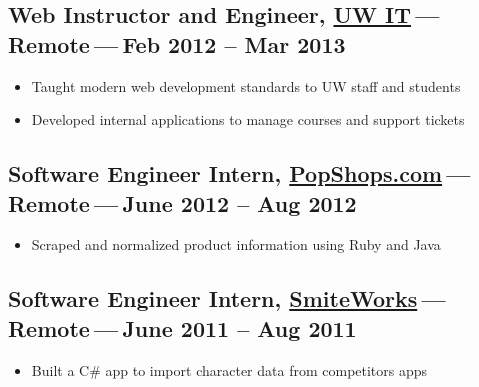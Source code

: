 \documentclass[11pt]{amsart}
\begin{document}
\hypertarget{x-web-instructor-and-engineer,-\href{https://www.washington.edu/lst/workshops/}{uw-it} — remote — feb-2012-–-mar-2013}{\subsection*{Web Instructor and Engineer, \href{https://www.washington.edu/lst/workshops/}{UW IT} — Remote — Feb 2012 – Mar 2013}}
\begin{itemize}

\item Taught modern web development standards to UW staff and students

\item Developed internal applications to manage courses and support tickets

\end{itemize}


\hypertarget{x-software-engineer-intern,-\href{https://www.popshops.com/}{popshops.com} — remote — june-2012-–-aug-2012}{\subsection*{Software Engineer Intern, \href{https://www.popshops.com/}{PopShops.com} — Remote — June 2012 – Aug 2012}}
\begin{itemize}

\item Scraped and normalized product information using Ruby and Java

\end{itemize}


\hypertarget{x-software-engineer-intern,-\href{https://www.smiteworks.com/}{smiteworks} — remote — june-2011-–-aug-2011}{\subsection*{Software Engineer Intern, \href{https://www.smiteworks.com/}{SmiteWorks} — Remote — June 2011 – Aug 2011}}
\begin{itemize}

\item Built a C# app to import character data from competitors apps

\end{itemize}
\end{document}
